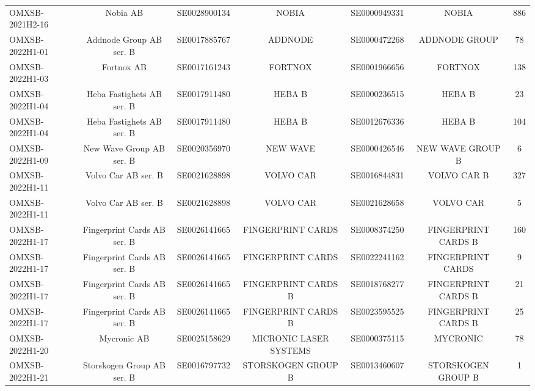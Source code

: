 \begin{threeparttable}
\begin{tabular}{@{}lcccccc}
\addlinespace[0.25ex]
\addlinespace[0.25ex]
OMXSB-2021H2-16 & Nobia AB & SE0028900134 & NOBIA & SE0000949331 & NOBIA & 886 \\
\addlinespace[0.25ex]
\addlinespace[0.25ex]
OMXSB-2022H1-01 & Addnode Group AB ser. B & SE0017885767 & ADDNODE & SE0000472268 & ADDNODE GROUP & 78 \\
\addlinespace[0.25ex]
\addlinespace[0.25ex]
OMXSB-2022H1-03 & Fortnox AB & SE0017161243 & FORTNOX & SE0001966656 & FORTNOX & 138 \\
\addlinespace[0.25ex]
\addlinespace[0.25ex]
OMXSB-2022H1-04 & Heba Fastighets AB ser. B & SE0017911480 & HEBA B & SE0000236515 & HEBA B & 23 \\
\addlinespace[0.25ex]
\addlinespace[0.25ex]
OMXSB-2022H1-04 & Heba Fastighets AB ser. B & SE0017911480 & HEBA B & SE0012676336 & HEBA B & 104 \\
\addlinespace[0.25ex]
\addlinespace[0.25ex]
OMXSB-2022H1-09 & New Wave Group AB ser. B & SE0020356970 & NEW WAVE & SE0000426546 & NEW WAVE GROUP B & 6 \\
\addlinespace[0.25ex]
\addlinespace[0.25ex]
OMXSB-2022H1-11 & Volvo Car AB ser. B & SE0021628898 & VOLVO CAR & SE0016844831 & VOLVO CAR B & 327 \\
\addlinespace[0.25ex]
\addlinespace[0.25ex]
OMXSB-2022H1-11 & Volvo Car AB ser. B & SE0021628898 & VOLVO CAR & SE0021628658 & VOLVO CAR & 5 \\
\addlinespace[0.25ex]
\addlinespace[0.25ex]
OMXSB-2022H1-17 & Fingerprint Cards AB ser. B & SE0026141665 & FINGERPRINT CARDS & SE0008374250 & FINGERPRINT CARDS B & 160 \\
\addlinespace[0.25ex]
\addlinespace[0.25ex]
OMXSB-2022H1-17 & Fingerprint Cards AB ser. B & SE0026141665 & FINGERPRINT CARDS & SE0022241162 & FINGERPRINT CARDS & 9 \\
\addlinespace[0.25ex]
\addlinespace[0.25ex]
OMXSB-2022H1-17 & Fingerprint Cards AB ser. B & SE0026141665 & FINGERPRINT CARDS B & SE0018768277 & FINGERPRINT CARDS B & 21 \\
\addlinespace[0.25ex]
\addlinespace[0.25ex]
OMXSB-2022H1-17 & Fingerprint Cards AB ser. B & SE0026141665 & FINGERPRINT CARDS B & SE0023595525 & FINGERPRINT CARDS B & 25 \\
\addlinespace[0.25ex]
\addlinespace[0.25ex]
OMXSB-2022H1-20 & Mycronic AB & SE0025158629 & MICRONIC LASER SYSTEMS & SE0000375115 & MYCRONIC & 78 \\
\addlinespace[0.25ex]
\addlinespace[0.25ex]
OMXSB-2022H1-21 & Storskogen Group AB ser. B & SE0016797732 & STORSKOGEN GROUP B & SE0013460607 & STORSKOGEN GROUP B & 1 \\

\end{tabular}
\end{threeparttable}
